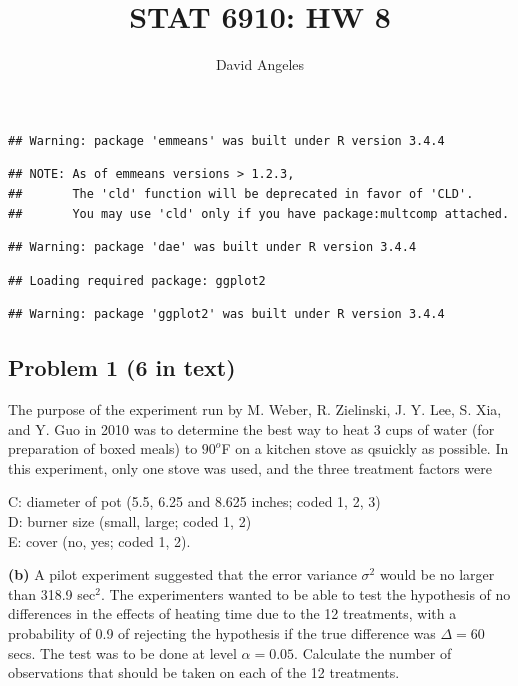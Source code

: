 \documentclass[12pt,]{article}
\title{STAT 6910: HW 8}
\author{David Angeles}
\date{}
\begin{document}
\maketitle

\begin{verbatim}
## Warning: package 'emmeans' was built under R version 3.4.4
\end{verbatim}

\begin{verbatim}
## NOTE: As of emmeans versions > 1.2.3,
##       The 'cld' function will be deprecated in favor of 'CLD'.
##       You may use 'cld' only if you have package:multcomp attached.
\end{verbatim}

\begin{verbatim}
## Warning: package 'dae' was built under R version 3.4.4
\end{verbatim}

\begin{verbatim}
## Loading required package: ggplot2
\end{verbatim}

\begin{verbatim}
## Warning: package 'ggplot2' was built under R version 3.4.4
\end{verbatim}

\subsection{Problem 1 (6 in text)}\label{problem-1-6-in-text}

The purpose of the experiment run by M. Weber, R. Zielinski, J. Y. Lee,
S. Xia, and Y. Guo in 2010 was to determine the best way to heat 3 cups
of water (for preparation of boxed meals) to \(90^o\)F on a kitchen
stove as qsuickly as possible. In this experiment, only one stove was
used, and the three treatment factors were

\begin{center}
C: diameter of pot (5.5, 6.25 and 8.625 inches; coded 1, 2, 3)\\
D: burner size (small, large; coded 1, 2)\\
E: cover (no, yes; coded 1, 2).
\end{center}

\textbf{(b)} A pilot experiment suggested that the error variance
\(\sigma^2\) would be no larger than 318.9 sec\(^2\). The experimenters
wanted to be able to test the hypothesis of no differences in the
effects of heating time due to the 12 treatments, with a probability of
0.9 of rejecting the hypothesis if the true difference was
\(\Delta= 60\) secs. The test was to be done at level \(\alpha = 0.05\).
Calculate the number of observations that should be taken on each of the
12 treatments.
\end{document}
